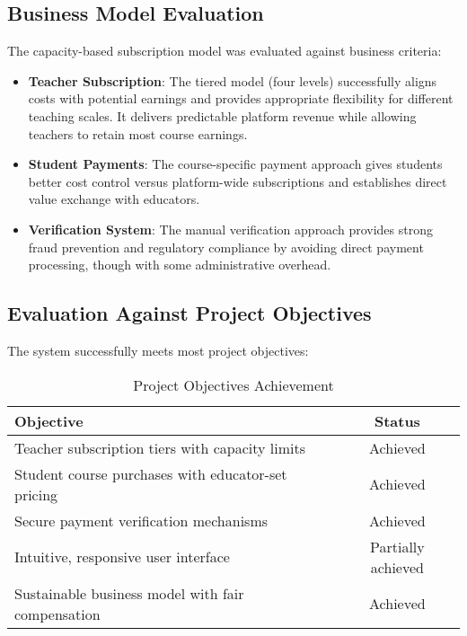 \subsection{Business Model Evaluation}

The capacity-based subscription model was evaluated against business criteria:

\begin{itemize}
    \item \textbf{Teacher Subscription}: The tiered model (four levels) successfully aligns costs with potential earnings and provides appropriate flexibility for different teaching scales. It delivers predictable platform revenue while allowing teachers to retain most course earnings.
    
    \item \textbf{Student Payments}: The course-specific payment approach gives students better cost control versus platform-wide subscriptions and establishes direct value exchange with educators.
    
    \item \textbf{Verification System}: The manual verification approach provides strong fraud prevention and regulatory compliance by avoiding direct payment processing, though with some administrative overhead.
\end{itemize}

\subsection{Evaluation Against Project Objectives}

The system successfully meets most project objectives:

\begin{table}[h]
\centering
\begin{tabular}{|p{8cm}|c|}
\hline
\textbf{Objective} & \textbf{Status} \\
\hline
Teacher subscription tiers with capacity limits & Achieved \\
Student course purchases with educator-set pricing & Achieved \\
Secure payment verification mechanisms & Achieved \\
Intuitive, responsive user interface & Partially achieved \\
Sustainable business model with fair compensation & Achieved \\
\hline
\end{tabular}
\caption{Project Objectives Achievement}
\label{tab:objectives}
\end{table}

